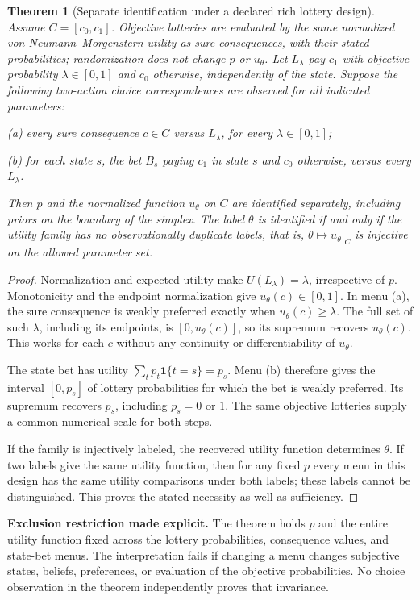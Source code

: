\documentclass[11pt,a4paper]{article}
\newtheorem{theorem}{Theorem}[section]
\theoremstyle{definition}\newtheorem{definition}[theorem]{Definition}
\theoremstyle{remark}\newtheorem{remark}[theorem]{Remark}
\newcommand{\1}{\mathbf 1}
\begin{document}
\begin{theorem}[Separate identification under a declared rich lottery design]\label{thm:lottery}
Assume $C=[c_0,c_1]$. Objective lotteries are evaluated by the same normalized von Neumann--Morgenstern utility as sure consequences, with their stated probabilities; randomization does not change $p$ or $u_\theta$. Let $L_\lambda$ pay $c_1$ with objective probability $\lambda\in[0,1]$ and $c_0$ otherwise, independently of the state. Suppose the following two-action choice correspondences are observed for all indicated parameters:

(a) every sure consequence $c\in C$ versus $L_\lambda$, for every $\lambda\in[0,1]$;

(b) for each state $s$, the bet $B_s$ paying $c_1$ in state $s$ and $c_0$ otherwise, versus every $L_\lambda$.

Then $p$ and the normalized function $u_\theta$ on $C$ are identified separately, including priors on the boundary of the simplex. The label $\theta$ is identified if and only if the utility family has no observationally duplicate labels, that is, $\theta\mapsto u_\theta|_C$ is injective on the allowed parameter set.
\end{theorem}
\begin{proof}
Normalization and expected utility make $U(L_\lambda)=\lambda$, irrespective of $p$. Monotonicity and the endpoint normalization give $u_\theta(c)\in[0,1]$. In menu (a), the sure consequence is weakly preferred exactly when $u_\theta(c)\ge\lambda$. The full set of such $\lambda$, including its endpoints, is $[0,u_\theta(c)]$, so its supremum recovers $u_\theta(c)$. This works for each $c$ without any continuity or differentiability of $u_\theta$.

The state bet has utility $\sum_t p_t\1\{t=s\}=p_s$. Menu (b) therefore gives the interval $[0,p_s]$ of lottery probabilities for which the bet is weakly preferred. Its supremum recovers $p_s$, including $p_s=0$ or $1$. The same objective lotteries supply a common numerical scale for both steps.

If the family is injectively labeled, the recovered utility function determines $\theta$. If two labels give the same utility function, then for any fixed $p$ every menu in this design has the same utility comparisons under both labels; these labels cannot be distinguished. This proves the stated necessity as well as sufficiency.
\end{proof}

\textbf{Exclusion restriction made explicit.} The theorem holds $p$ and the entire utility function fixed across the lottery probabilities, consequence values, and state-bet menus. The interpretation fails if changing a menu changes subjective states, beliefs, preferences, or evaluation of the objective probabilities. No choice observation in the theorem independently proves that invariance.
\end{document}
